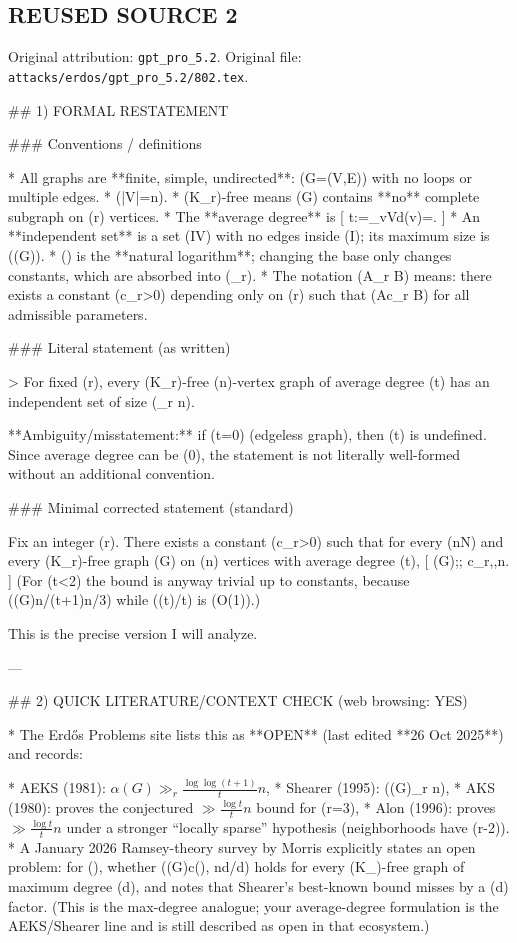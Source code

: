 \subsection*{REUSED SOURCE 2}
Original attribution: \texttt{gpt\_pro\_5.2}.
Original file: \texttt{attacks/erdos/gpt\_pro\_5.2/802.tex}.

## 1) FORMAL RESTATEMENT

### Conventions / definitions

* All graphs are **finite, simple, undirected**: (G=(V,E)) with no loops or multiple edges.
* (|V|=n).
* (K_r)-free means (G) contains **no** complete subgraph on (r) vertices.
* The **average degree** is
  [
  t:=\sum_{v\in V}d(v)=.
  ]
* An **independent set** is a set (I\subseteq V) with no edges inside (I); its maximum size is (\alpha(G)).
* (\log) is the **natural logarithm**; changing the base only changes constants, which are absorbed into (\gg_r).
* The notation (A\gg_r B) means: there exists a constant (c_r>0) depending only on (r) such that (A\ge c_r B) for all admissible parameters.

### Literal statement (as written)

> For fixed (r), every (K_r)-free (n)-vertex graph of average degree (t) has an independent set of size (\gg_r n).

**Ambiguity/misstatement:** if (t=0) (edgeless graph), then (\log t) is undefined. Since average degree can be (0), the statement is not literally well-formed without an additional convention.

### Minimal corrected statement (standard)

Fix an integer (r).
There exists a constant (c_r>0) such that for every (n\in\mathbb N) and every (K_r)-free graph (G) on (n) vertices with average degree (t),
[
\alpha(G);\ge; c_r,,n.
]
(For (t<2) the bound is anyway trivial up to constants, because (\alpha(G)\ge n/(t+1)\ge n/3) while ((\log t)/t) is (O(1)).)

This is the precise version I will analyze.

---

## 2) QUICK LITERATURE/CONTEXT CHECK (web browsing: YES)

* The Erdős Problems site lists this as **OPEN** (last edited **26 Oct 2025**) and records:

  * AEKS (1981): \(\alpha(G)\gg_r \frac{\log\log(t+1)}{t}n\),
  * Shearer (1995): (\alpha(G)\gg_r n),
  * AKS (1980): proves the conjectured \(\gg \frac{\log t}{t}n\) bound for (r=3),
  * Alon (1996): proves \(\gg \frac{\log t}{t}n\) under a stronger “locally sparse” hypothesis (neighborhoods have (\chi\le r-2)).
* A January 2026 Ramsey-theory survey by Morris explicitly states an open problem: for (\ell{}), whether (\alpha(G)\ge c(\ell), n\log d/d) holds for every (K_\ell)-free graph of maximum degree (d), and notes that Shearer’s best-known bound misses by a (\log\log d) factor.
  (This is the max-degree analogue; your average-degree formulation is the AEKS/Shearer line and is still described as open in that ecosystem.)

